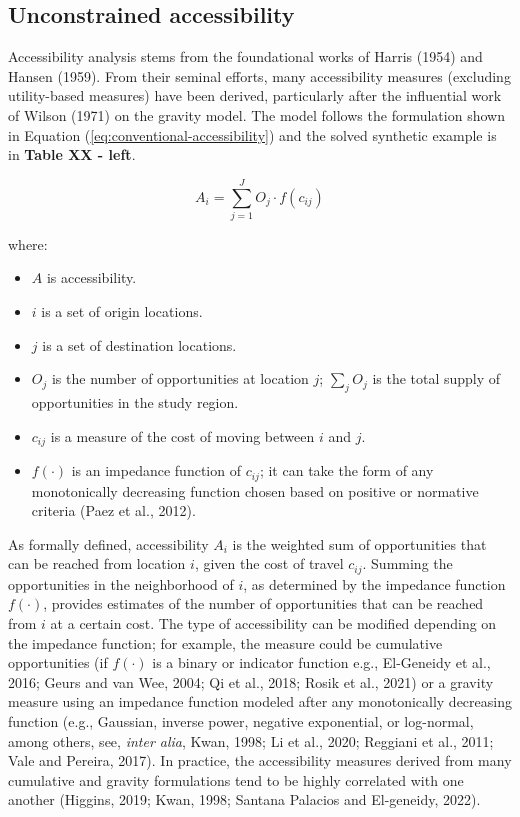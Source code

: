 \documentclass[]{elsarticle} %
\providecommand{\tightlist}{%
  \setlength{\itemsep}{0pt}\setlength{\parskip}{0pt}}
\begin{document}
\hypertarget{unconstrained-accessibility}{%
\subsection{Unconstrained
accessibility}\label{unconstrained-accessibility}}

Accessibility analysis stems from the foundational works of Harris
(1954) and Hansen (1959). From their seminal efforts, many accessibility
measures (excluding utility-based measures) have been derived,
particularly after the influential work of Wilson (1971) on the gravity
model. The model follows the formulation shown in Equation
(\ref{eq:conventional-accessibility}) and the solved synthetic example
is in \textbf{Table XX - left}.

\begin{equation}
\label{eq:conventional-accessibility}
A_i = \sum_{j=1}^JO_j \cdot f(c_{ij})
\end{equation}

\noindent where:

\begin{itemize}
\tightlist
\item
  \(A\) is accessibility.
\item
  \(i\) is a set of origin locations.
\item
  \(j\) is a set of destination locations.
\item
  \(O_j\) is the number of opportunities at location \(j\);
  \(\sum_j O_j\) is the total supply of opportunities in the study
  region.
\item
  \(c_{ij}\) is a measure of the cost of moving between \(i\) and \(j\).
\item
  \(f(\cdot)\) is an impedance function of \(c_{ij}\); it can take the
  form of any monotonically decreasing function chosen based on positive
  or normative criteria (Paez et al., 2012).
\end{itemize}

As formally defined, accessibility \(A_i\) is the weighted sum of
opportunities that can be reached from location \(i\), given the cost of
travel \(c_{ij}\). Summing the opportunities in the neighborhood of
\(i\), as determined by the impedance function \(f(\cdot)\), provides
estimates of the number of opportunities that can be reached from \(i\)
at a certain cost. The type of accessibility can be modified depending
on the impedance function; for example, the measure could be cumulative
opportunities (if \(f(\cdot)\) is a binary or indicator function e.g.,
El-Geneidy et al., 2016; Geurs and van Wee, 2004; Qi et al., 2018; Rosik
et al., 2021) or a gravity measure using an impedance function modeled
after any monotonically decreasing function (e.g., Gaussian, inverse
power, negative exponential, or log-normal, among others, see,
\emph{inter alia}, Kwan, 1998; Li et al., 2020; Reggiani et al., 2011;
Vale and Pereira, 2017). In practice, the accessibility measures derived
from many cumulative and gravity formulations tend to be highly
correlated with one another (Higgins, 2019; Kwan, 1998; Santana Palacios
and El-geneidy, 2022).
\end{document}
